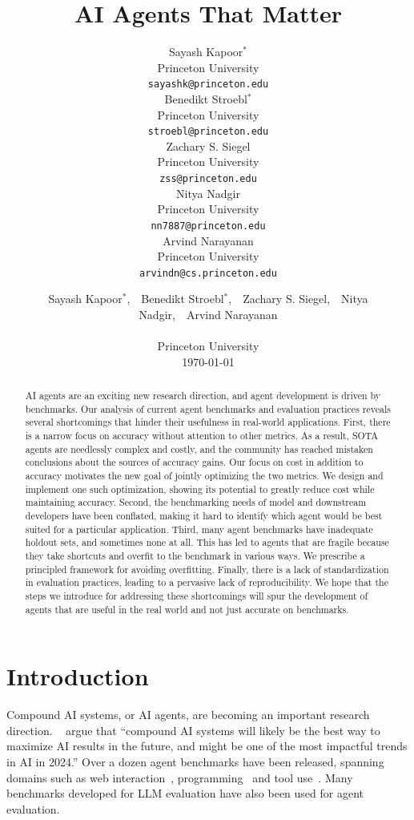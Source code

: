 \documentclass{article}
\title{AI Agents That Matter}
\author{%
  Sayash Kapoor$^*$ \\
  Princeton University \\
  \texttt{sayashk@princeton.edu} \\
  \And
  Benedikt Stroebl$^*$\\
  Princeton University \\
  \texttt{stroebl@princeton.edu} \\
  \AND
  Zachary S. Siegel \\
  Princeton University\\
  \texttt{zss@princeton.edu} \\
  \And
  Nitya Nadgir \\
  Princeton University \\
  \texttt{nn7887@princeton.edu} \\
  \And
  Arvind Narayanan \\
  Princeton University  \\
  \texttt{arvindn@cs.princeton.edu} \\
}
\author{Sayash Kapoor$^*$,\ \ Benedikt Stroebl$^*$,\ \ Zachary S. Siegel,\ \ Nitya Nadgir,\ \ Arvind Narayanan \\
\\ Princeton University \\ \today}
\begin{document}
\def\thefootnote{*}\def\thefootnote{\arabic{footnote}}

\maketitle

\begin{abstract}
AI agents are an exciting new research direction, and agent development is driven by benchmarks. Our analysis of current agent benchmarks and evaluation practices reveals several shortcomings that hinder their usefulness in real-world applications. First, there is a narrow focus on accuracy without attention to other metrics. As a result, SOTA agents are needlessly complex and costly, and the community has reached mistaken conclusions about the sources of accuracy gains. Our focus on cost in addition to accuracy motivates the new goal of jointly optimizing the two metrics. We design and implement one such optimization, showing its potential to greatly reduce cost while maintaining accuracy. Second, the benchmarking needs of model and downstream developers have been conflated, making it hard to identify which agent would be best suited for a particular application. Third, many agent benchmarks have inadequate holdout sets, and sometimes none at all. This has led to agents that are fragile because they take shortcuts and overfit to the benchmark in various ways. We prescribe a principled framework for avoiding overfitting. Finally, there is a lack of standardization in evaluation practices, leading to a pervasive lack of reproducibility. We hope that the steps we introduce for addressing these shortcomings will spur the development of agents that are useful in the real world and not just accurate on benchmarks.
\end{abstract}

\section{Introduction}
\label{sec:intro}

Compound AI systems, or AI agents, are becoming an important research direction. ~\citet{zaharia_shift_2024} argue that ``compound AI systems will likely be the best way to maximize AI results in the future, and might be one of the most impactful trends in AI in 2024.'' Over a dozen agent benchmarks have been released, spanning domains such as web interaction~\citep{zhou_webarena_2024}, programming~\citep{jimenez_swe-bench_2023} and tool use~\citep{ruan_identifying_2024}. Many benchmarks developed for LLM evaluation have also been used for agent evaluation. %
\end{document}
